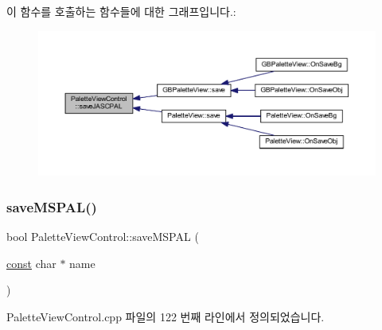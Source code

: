 이 함수를 호출하는 함수들에 대한 그래프입니다.\+:
\nopagebreak
\begin{figure}[H]
\begin{center}
\leavevmode
\includegraphics[width=350pt]{class_palette_view_control_a9efcff77eaf476013ac5f3ebd2d53779_icgraph}
\end{center}
\end{figure}
\mbox{\label{class_palette_view_control_a0e2249bb157bf7fb36b128a83bf108b5}} 
\subsubsection{\texorpdfstring{save\+M\+S\+P\+A\+L()}{saveMSPAL()}}
{\footnotesize\ttfamily bool Palette\+View\+Control\+::save\+M\+S\+P\+AL (\begin{DoxyParamCaption}\item[{\mbox{\hyperlink{getopt1_8c_a2c212835823e3c54a8ab6d95c652660e}{const}} char $\ast$}]{name }\end{DoxyParamCaption})}



Palette\+View\+Control.\+cpp 파일의 122 번째 라인에서 정의되었습니다.



